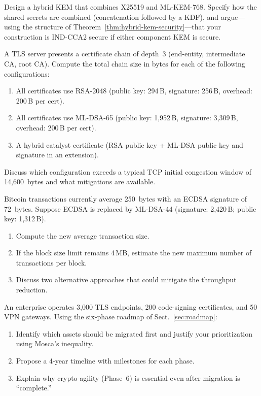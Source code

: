 \begin{prob}
\label{prob:ch13-hybrid-kem}
Design a hybrid KEM that combines X25519 and ML-KEM-768.  Specify how the shared secrets are combined (concatenation followed by a KDF), and argue---using the structure of Theorem~\ref{thm:hybrid-kem-security}---that your construction is IND-CCA2 secure if either component KEM is secure.
\end{prob}

\begin{prob}
\label{prob:ch13-cert-chain}
A TLS server presents a certificate chain of depth~3 (end-entity, intermediate CA, root CA).  Compute the total chain size in bytes for each of the following configurations:
\begin{enumerate}
\item[(a)] All certificates use RSA-2048 (public key: 294\,B, signature: 256\,B, overhead: 200\,B per cert).
\item[(b)] All certificates use ML-DSA-65 (public key: 1{,}952\,B, signature: 3{,}309\,B, overhead: 200\,B per cert).
\item[(c)] A hybrid catalyst certificate (RSA public key + ML-DSA public key and signature in an extension).
\end{enumerate}
Discuss which configuration exceeds a typical TCP initial congestion window of 14{,}600~bytes and what mitigations are available.
\end{prob}

\begin{prob}
\label{prob:ch13-blockchain}
Bitcoin transactions currently average 250~bytes with an ECDSA signature of 72~bytes.  Suppose ECDSA is replaced by ML-DSA-44 (signature: 2{,}420\,B; public key: 1{,}312\,B).
\begin{enumerate}
\item[(a)] Compute the new average transaction size.
\item[(b)] If the block size limit remains 4\,MB, estimate the new maximum number of transactions per block.
\item[(c)] Discuss two alternative approaches that could mitigate the throughput reduction.
\end{enumerate}
\end{prob}

\begin{prob}
\label{prob:ch13-roadmap}
An enterprise operates 3{,}000 TLS endpoints, 200 code-signing certificates, and 50 VPN gateways.  Using the six-phase roadmap of Sect.~\ref{sec:roadmap}:
\begin{enumerate}
\item[(a)] Identify which assets should be migrated first and justify your prioritization using Mosca's inequality.
\item[(b)] Propose a 4-year timeline with milestones for each phase.
\item[(c)] Explain why crypto-agility (Phase~6) is essential even after migration is ``complete.''
\end{enumerate}
\end{prob}
